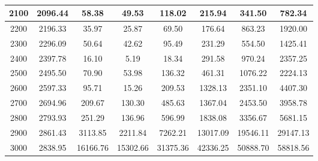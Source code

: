 \begin{table}[!h]
\begin{adjustwidth}{-2cm}{-2cm}
\begin{tabular}{|c|c|c|c|c|c|c|c|}
			2100 & 2096.44 & 58.38 & 49.53 & 118.02 & 215.94 & 341.50 & 782.34 \\ \hline
			2200 & 2196.33 & 35.97 & 25.87 & 69.50 & 176.64 & 863.23 & 1920.00 \\ \hline
			2300 & 2296.09 & 50.64 & 42.62 & 95.49 & 231.29 & 554.50 & 1425.41 \\ \hline
			2400 & 2397.78 & 16.10 & 5.19 & 18.34 & 291.58 & 970.24 & 2357.25 \\ \hline
			2500 & 2495.50 & 70.90 & 53.98 & 136.32 & 461.31 & 1076.22 & 2224.13 \\ \hline
			2600 & 2597.33 & 95.71 & 15.26 & 209.53 & 1328.13 & 2351.10 & 4407.30 \\ \hline
			2700 & 2694.96 & 209.67 & 130.30 & 485.63 & 1367.04 & 2453.50 & 3958.78 \\ \hline
			2800 & 2793.93 & 251.29 & 136.96 & 596.99 & 1838.08 & 3356.67 & 5681.15 \\ \hline
			2900 & 2861.43 & 3113.85 & 2211.84 & 7262.21 & 13017.09 & 19546.11 & 29147.13 \\ \hline
			3000 & 2838.95 & 16166.76 & 15302.66 & 31375.36 & 42336.25 & 50888.70 & 58818.56 \\ \hline
		\end{tabular}
		\centering
		\caption{}
		\label{result::}
	\end{adjustwidth}
\end{table}
